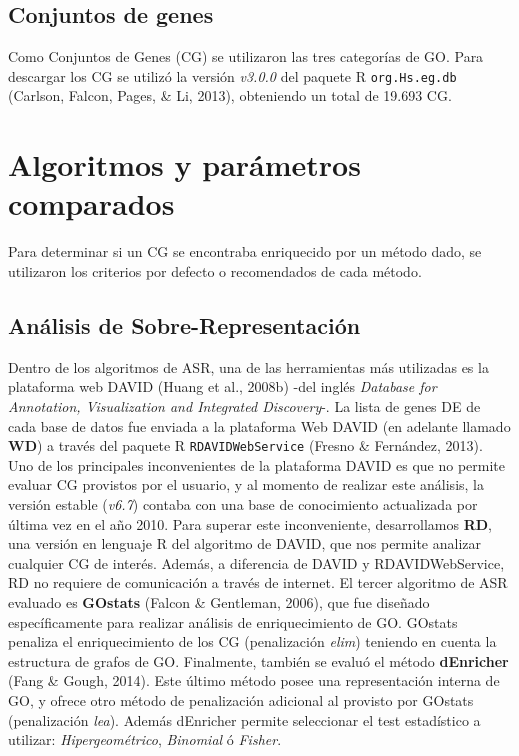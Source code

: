 \documentclass[12pt,twoside]{reedthesis}
\begin{document}
\hypertarget{conjuntos-de-genes}{%
\subsection{Conjuntos de genes}\label{conjuntos-de-genes}}

Como Conjuntos de Genes (CG) se utilizaron las tres categorías de GO. Para descargar los CG se utilizó la versión \emph{v3.0.0} del paquete R \texttt{org.Hs.eg.db} (Carlson, Falcon, Pages, \& Li, 2013), obteniendo un total de 19.693 CG.

\hypertarget{sec:algosComparados}{%
\section{Algoritmos y parámetros comparados}\label{sec:algosComparados}}

Para determinar si un CG se encontraba enriquecido por un método dado, se utilizaron los criterios por defecto o recomendados de cada método.

\hypertarget{anuxe1lisis-de-sobre-representaciuxf3n}{%
\subsection{Análisis de Sobre-Representación}\label{anuxe1lisis-de-sobre-representaciuxf3n}}

Dentro de los algoritmos de ASR, una de las herramientas más utilizadas es la plataforma web DAVID (Huang et al., 2008b) -del inglés \emph{Database for Annotation, Visualization and Integrated Discovery}-. La lista de genes DE de cada base de datos fue enviada a la plataforma Web DAVID (en adelante llamado \textbf{WD}) a través del paquete R \texttt{RDAVIDWebService} (Fresno \& Fernández, 2013). Uno de los principales inconvenientes de la plataforma DAVID es que no permite evaluar CG provistos por el usuario, y al momento de realizar este análisis, la versión estable (\emph{v6.7}) contaba con una base de conocimiento actualizada por última vez en el año 2010. Para superar este inconveniente, desarrollamos \textbf{RD}, una versión en lenguaje R del algoritmo de DAVID, que nos permite analizar cualquier CG de interés. Además, a diferencia de DAVID y RDAVIDWebService, RD no requiere de comunicación a través de internet. El tercer algoritmo de ASR evaluado es \textbf{GOstats} (Falcon \& Gentleman, 2006), que fue diseñado específicamente para realizar análisis de enriquecimiento de GO. GOstats penaliza el enriquecimiento de los CG (penalización \emph{elim}) teniendo en cuenta la estructura de grafos de GO. Finalmente, también se evaluó el método \textbf{dEnricher} (Fang \& Gough, 2014). Este último método posee una representación interna de GO, y ofrece otro método de penalización adicional al provisto por GOstats (penalización \emph{lea}). Además dEnricher permite seleccionar el test estadístico a utilizar: \emph{Hipergeométrico}, \emph{Binomial} ó \emph{Fisher}.
\end{document}
